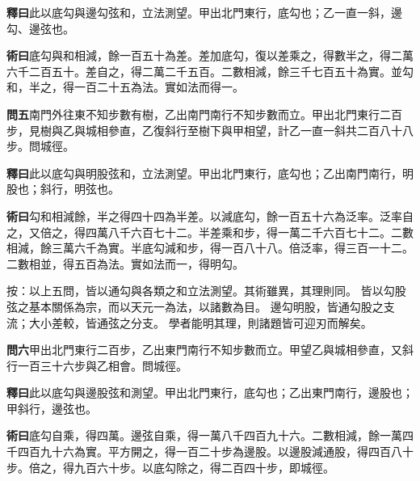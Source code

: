 \documentclass[12pt,a4paper]{article}
\begin{document}
\vspace{0.3em}

\noindent\textbf{釋曰}\quad 此以底勾與邊勾弦和，立法測望。甲出北門東行，底勾也；乙一直一斜，邊勾、邊弦也。

\vspace{0.3em}

\noindent\textbf{術曰}\quad 底勾與和相減，餘一百五十為差。差加底勾，復以差乘之，得數半之，得二萬六千二百五十。差自之，得二萬二千五百。二數相減，餘三千七百五十為實。並勾和，半之，得一百二十五為法。實如法而得一。

\vspace{0.5em}

\noindent\textbf{問五}\quad 南門外往東不知步數有樹，乙出南門南行不知步數而立。甲出北門東行二百步，見樹與乙與城相參直，乙復斜行至樹下與甲相望，計乙一直一斜共二百八十八步。問城徑。

\vspace{0.3em}

\noindent\textbf{釋曰}\quad 此以底勾與明股弦和，立法測望。甲出北門東行，底勾也；乙出南門南行，明股也；斜行，明弦也。

\vspace{0.3em}

\noindent\textbf{術曰}\quad 勾和相減餘，半之得四十四為半差。以減底勾，餘一百五十六為泛率。泛率自之，又倍之，得四萬八千六百七十二。半差乘和步，得一萬二千六百七十二。二數相減，餘三萬六千為實。半底勾減和步，得一百八十八。倍泛率，得三百一十二。二數相並，得五百為法。實如法而一，得明勾。

\vspace{0.5em}

\noindent
按：以上五問，皆以通勾與各類之和立法測望。其術雖異，其理則同。
皆以勾股弦之基本關係為宗，而以天元一為法，以諸數為目。
邊勾明股，皆通勾股之支流；大小差較，皆通弦之分支。
學者能明其理，則諸題皆可迎刃而解矣。

\vspace{0.5em}

\noindent\textbf{問六}\quad 甲出北門東行二百步，乙出東門南行不知步數而立。甲望乙與城相參直，又斜行一百三十六步與乙相會。問城徑。

\vspace{0.3em}

\noindent\textbf{釋曰}\quad 此以底勾與邊股弦和測望。甲出北門東行，底勾也；乙出東門南行，邊股也；甲斜行，邊弦也。

\vspace{0.3em}

\noindent\textbf{術曰}\quad 底勾自乘，得四萬。邊弦自乘，得一萬八千四百九十六。二數相減，餘一萬四千四百九十六為實。平方開之，得一百二十步為邊股。以邊股減通股，得四百八十步。倍之，得九百六十步。以底勾除之，得二百四十步，即城徑。
\end{document}
